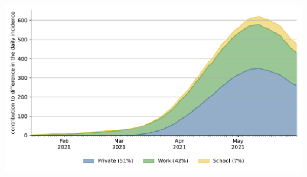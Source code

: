\documentclass[11pt]{beamer}
\begin{document}
\begin{frame}
    \centering
    \includegraphics[width=\textwidth]{figures/results/figures/full_decomposition_rapid_tests_area}
\end{frame}



 {
    \begin{frame}
        \frametitle{}
    \end{frame}

}



%     
\end{document}
